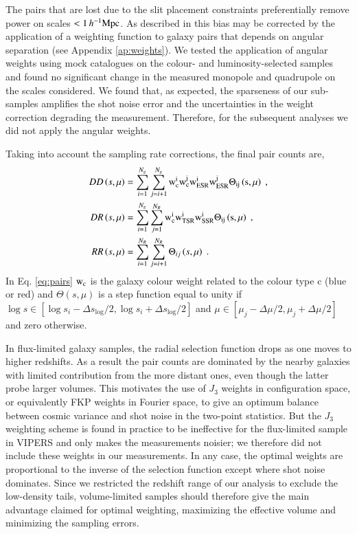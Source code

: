 \documentclass[longauth]{aa}
\def\({\left(}
\def\){\right)}
\def\mhmpc{\,h^{-1}{\rm Mpc}}
\begin{document}
The pairs that are lost due to the slit placement constraints preferentially remove power on scales $<1\mhmpc$.   As described in \citet{delatorre13a} this bias may be corrected by the application of a weighting function to galaxy pairs that depends on angular separation (see Appendix \ref{ap:weights}).  We tested the application of angular weights using mock catalogues on the colour- and luminosity-selected samples and found no significant change in the measured monopole and quadrupole on the scales considered. We found that, as expected, the sparseness of our sub-samples amplifies the shot noise error and the uncertainties in the weight correction degrading the measurement. Therefore, for the subsequent analyses we did not apply the angular weights.

Taking into account the sampling rate corrections, the final pair counts are,
	\begin{subequations}
		\label{eq:pairs}
		\begin{align}
			DD\(s,\mu\)		&=	\sum_{i=1}^{N_g}\sum_{j=i+1}^{N_g}\rm{w_{c}^iw_{c}^jw_{ESR}^iw_{ESR}^j}\Theta_{ij}\(s,\mu\)\; ,		\\
			DR\(s,\mu\)		&=	\sum_{i=1}^{N_g}\sum_{j=1}^{N_R}\rm{w_{c}^iw_{TSR}^iw_{SSR}^i}\Theta_{ij}\(s,\mu\)\; ,								\\
			RR\(s,\mu\)		&=	\sum_{i=1}^{N_R}\sum_{j=i+1}^{N_R}\Theta_{ij}\(s,\mu\)\; .
		\end{align}
	\end{subequations}
In Eq. \eqref{eq:pairs} $\rm{w_{c}}$ is the galaxy colour weight related to the colour type c (blue or red) and $\Theta\(s,\mu\)$ is a step function equal to unity if $\log s\in[\log s_i-\Delta s_{\log}/2,\log s_i+\Delta s_{\log}/2]$ and $\mu\in[\mu_j-\Delta\mu/2,\mu_j+\Delta\mu/2]$ and zero otherwise.

In flux-limited galaxy samples, the radial selection function drops as one moves to higher redshifts. As a result the pair counts are dominated by the nearby galaxies with limited contribution from the more distant ones, even though the latter probe larger volumes. This motivates the use of $J_3$ weights \citep{hamilton93} in configuration space, or equivalently FKP weights \citep{feldman94} in Fourier space, to give an optimum balance between cosmic variance and shot noise in the two-point statistics. But the $J_3$ weighting scheme is found in practice to be ineffective for the flux-limited sample in VIPERS \citep{delatorre13a} and only makes the measurements noisier; we therefore did not include these weights in our measurements. In any case, the optimal weights are proportional to the inverse of the selection function except where shot noise dominates. Since we restricted the redshift range of our analysis to exclude the low-density tails, volume-limited samples should therefore give the main advantage claimed for optimal weighting, maximizing the effective volume and minimizing the sampling errors.
\end{document}
